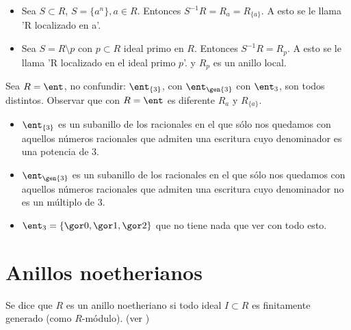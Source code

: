\notacion
\begin{itemize}
	\item Sea $S \subset R$, $S=\{ a^n \}, a \in R$. Entonces $S^{-1}R=R_a=R_{\{a\}}$. A esto se le llama 'R localizado en a'.
	\item Sea $S=R \setminus p$ con $p \subset R$ ideal primo en $R$. Entonces $S^{-1}R=R_p$. A esto se le llama 'R localizado en el ideal primo $p$'. y $R_p$ es un anillo local.
\end{itemize}
Sea $R=\ent$, no confundir: $\ent_{\{3\}}$, con $\ent_{\gen{3}}$ con $\ent_3$, son todos distintos. Observar que con $R=\ent$ es diferente $R_a$ y $R_{\{a\}}$.
\begin{itemize}
	\item $\ent_{\{3\}}$ es un subanillo de los racionales en el que sólo nos quedamos con aquellos números racionales que admiten una escritura cuyo denominador es una potencia de 3.
	\item $\ent_{\gen{3}}$ es un subanillo de los racionales en el que sólo nos quedamos con aquellos números racionales que admiten una escritura cuyo denominador no es un múltiplo de 3.
	\item $\ent_3=\{ \cls{0},\cls{1},\cls{2} \}$ que no tiene nada que ver con todo esto.
\end{itemize}

\section{Anillos noetherianos}
\begin{defn} \label{def:AnilloNoetheriano}
	Se dice que $R$ es un anillo noetheriano si todo ideal $I \subset R$ es finitamente generado (como $R$-módulo). (ver )

\end{defn}

